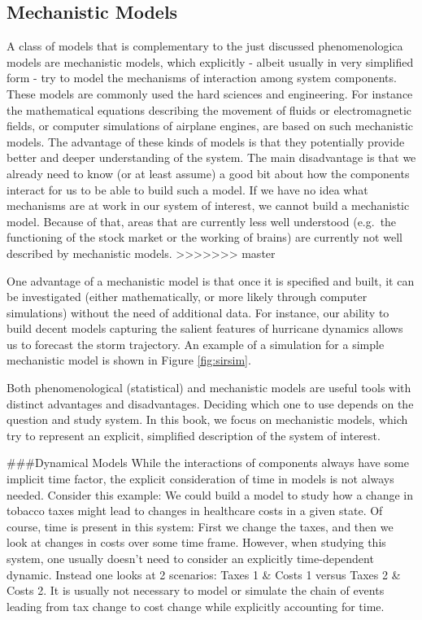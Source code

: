 \documentclass[]{book}
\theoremstyle{definition}
\theoremstyle{definition}
\theoremstyle{definition}
\theoremstyle{remark}
\begin{document}
\subsection{Mechanistic Models}\label{mechanistic-models}

A class of models that is complementary to the just discussed
phenomenologica models are mechanistic models, which explicitly - albeit
usually in very simplified form - try to model the mechanisms of
interaction among system components. These models are commonly used the
hard sciences and engineering. For instance the mathematical equations
describing the movement of fluids or electromagnetic fields, or computer
simulations of airplane engines, are based on such mechanistic models.
The advantage of these kinds of models is that they potentially provide
better and deeper understanding of the system. The main disadvantage is
that we already need to know (or at least assume) a good bit about how
the components interact for us to be able to build such a model. If we
have no idea what mechanisms are at work in our system of interest, we
cannot build a mechanistic model. Because of that, areas that are
currently less well understood (e.g.~the functioning of the stock market
or the working of brains) are currently not well described by
mechanistic models.
>>>>>>> master

One advantage of a mechanistic model is that once it is specified and
built, it can be investigated (either mathematically, or more likely
through computer simulations) without the need of additional data. For
instance, our ability to build decent models capturing the salient
features of hurricane dynamics allows us to forecast the storm
trajectory. An example of a simulation for a simple mechanistic model is
shown in Figure \ref{fig:sirsim}.

Both phenomenological (statistical) and mechanistic models are useful
tools with distinct advantages and disadvantages. Deciding which one to
use depends on the question and study system. In this book, we focus on
mechanistic models, which try to represent an explicit, simplified
description of the system of interest.

\#\#\#Dynamical Models While the interactions of components always have
some implicit time factor, the explicit consideration of time in models
is not always needed. Consider this example: We could build a model to
study how a change in tobacco taxes might lead to changes in healthcare
costs in a given state. Of course, time is present in this system: First
we change the taxes, and then we look at changes in costs over some time
frame. However, when studying this system, one usually doesn't need to
consider an explicitly time-dependent dynamic. Instead one looks at 2
scenarios: Taxes 1 \& Costs 1 versus Taxes 2 \& Costs 2. It is usually
not necessary to model or simulate the chain of events leading from tax
change to cost change while explicitly accounting for time.
\end{document}

